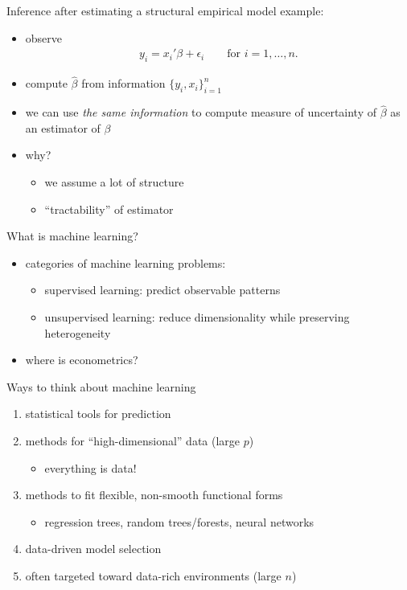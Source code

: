 \documentclass[xcolor=dvipsnames, handout]{beamer}
\begin{document}
\begin{frame}{Inference after estimating a structural empirical model}
example: 
\begin{itemize}
  \item 
  observe
  \begin{align*}
    y_i = x_i'\beta + \epsilon_i \qquad \text{for $i = 1, \dotsc, n$}.
  \end{align*}
  \item 
  compute $\hat{\beta}$ from information $\{y_i, x_i\}_{i=1}^n$ 
  \item 
  \pause
  we can use \emph{the same information} to compute measure of uncertainty of $\hat{\beta}$ as an estimator of $\beta$
  \item why? 
  \pause 
  \begin{itemize}
    \item we assume a lot of structure 
    \item ``tractability'' of estimator
  \end{itemize}
\end{itemize}
\end{frame}


\begin{frame}{What is machine learning?}
\pause
\begin{itemize}
  \item categories of machine learning problems:
  \begin{itemize}
  \item supervised learning: predict observable patterns
  \item unsupervised learning: reduce dimensionality while preserving heterogeneity
  \end{itemize}
  \pause
  \item where is econometrics?
\end{itemize}
\end{frame}


\begin{frame}{Ways to think about machine learning}
\begin{enumerate}
  \item
  statistical tools for prediction
  \pause\item 
  methods for ``high-dimensional'' data (large $p$)
  \begin{itemize}
    \pause\item everything is data!
  \end{itemize}
  \pause\item 
  methods to fit flexible, non-smooth functional forms 
  \begin{itemize}
    \item regression trees, random trees/forests, neural networks
  \end{itemize}
  \pause\item 
  data-driven model selection
  \pause\item 
  often targeted toward data-rich environments (large $n$)
\end{enumerate}
\end{frame}
\end{document}
